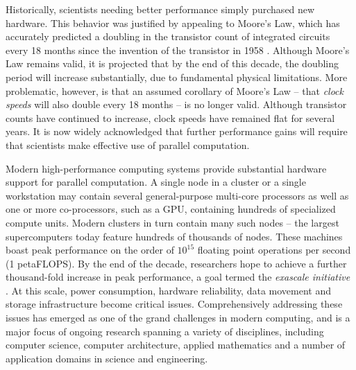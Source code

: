 \documentclass[12pt]{article}
\begin{document}
Historically, scientists needing better performance simply purchased new hardware. This behavior was justified by appealing to Moore's Law, which has accurately predicted a doubling in the transistor count of integrated circuits every 18 months since the invention of the transistor in 1958 \cite{moore1998cramming}. Although Moore's Law remains valid, it is projected that by the end of this decade, the doubling period will increase substantially, due to fundamental physical limitations. More problematic, however, is that an assumed corollary of Moore's Law -- that {\it clock speeds} will also double every 18 months -- is no longer valid. Although transistor counts have continued to increase, clock speeds have remained flat for several years. It is now widely acknowledged that further performance gains will require that scientists make effective use of parallel computation. 

Modern high-performance computing systems provide substantial hardware support for parallel computation. A single node in a cluster or a single workstation may contain several general-purpose multi-core processors as well as one or more  co-processors, such as a GPU, containing hundreds of specialized compute units. Modern clusters in turn  contain many such nodes -- the largest supercomputers today feature hundreds of thousands of nodes. These machines boast peak performance on the order of $10^{15}$ floating point operations per second (1 petaFLOPS). By the end of the decade, researchers hope to achieve a further thousand-fold increase in peak performance, a goal termed the {\it exascale initiative} \cite{exascale-roadmap}. At this scale, power consumption, hardware reliability, data movement and storage infrastructure become critical issues. Comprehensively addressing these issues  has emerged as one of the grand challenges in modern computing, and is a major focus of ongoing research spanning a variety of disciplines, including computer science, computer architecture, applied mathematics and a number of application domains in science and engineering.
\end{document}
